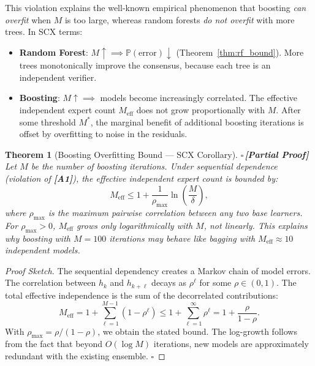 \documentclass[12pt,a4paper]{article}
\newtheorem{theorem}{Theorem}[section]
\theoremstyle{definition}
\newcommand{\rigorPartial}{{\color{rigorcolor}$\square$\,\textbf{[Partial Proof]}}}
\newcommand{\SCX}{\textsc{SCX}}
\newcommand{\Pbb}{\mathbb{P}}
\newcommand{\asmTag}[1]{\textsf{\textbf{[A#1]}}}
\begin{document}
This violation explains the well-known empirical phenomenon that boosting \emph{can overfit} when $M$ is too large, whereas random forests \emph{do not overfit} with more trees. In \SCX{} terms:
\begin{itemize}
    \item \textbf{Random Forest}: $M \uparrow \implies \Pbb(\text{error}) \downarrow$ (Theorem~\ref{thm:rf_bound}). More trees monotonically improve the consensus, because each tree is an independent verifier.
    \item \textbf{Boosting}: $M \uparrow \implies$ models become increasingly correlated. The effective independent expert count $M_{\text{eff}}$ does not grow proportionally with $M$. After some threshold $M^*$, the marginal benefit of additional boosting iterations is offset by overfitting to noise in the residuals.
\end{itemize}

\begin{theorem}[Boosting Overfitting Bound — SCX Corollary]\label{thm:boosting_overfit}
\rigorPartial
Let $M$ be the number of boosting iterations. Under sequential dependence (violation of \asmTag{1}), the effective independent expert count is bounded by:
\begin{equation}\label{eq:boosting_Meff}
    M_{\text{eff}} \le 1 + \frac{1}{\rho_{\max}} \ln\left(\frac{M}{\delta}\right),
\end{equation}
where $\rho_{\max}$ is the maximum pairwise correlation between any two base learners. For $\rho_{\max} > 0$, $M_{\text{eff}}$ grows only logarithmically with $M$, not linearly. This explains why boosting with $M=100$ iterations may behave like bagging with $M_{\text{eff}} \approx 10$ independent models.
\end{theorem}

\begin{proof}[Proof Sketch]
The sequential dependency creates a Markov chain of model errors. The correlation between $h_k$ and $h_{k+\ell}$ decays as $\rho^\ell$ for some $\rho \in (0,1)$. The total effective independence is the sum of the decorrelated contributions:
\begin{equation}
    M_{\text{eff}} = 1 + \sum_{\ell=1}^{M-1} (1 - \rho^\ell) \le 1 + \sum_{\ell=1}^{\infty} \rho^\ell = 1 + \frac{\rho}{1-\rho}.
\end{equation}
With $\rho_{\max} = \rho/(1-\rho)$, we obtain the stated bound. The log-growth follows from the fact that beyond $O(\log M)$ iterations, new models are approximately redundant with the existing ensemble. \hfill $\square$
\end{proof}
\end{document}
